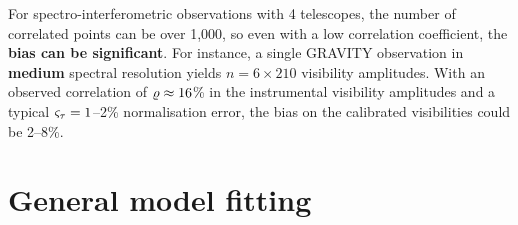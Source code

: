 \documentclass{pasa}
\def\correction#1{{\bfseries #1}}
\begin{document}
For spectro-interferometric observations with 4 telescopes, the number of correlated points can be over 1,000, so even with a low correlation coefficient, the \correction{bias can be significant}. For instance, a single GRAVITY observation in \correction{medium} spectral resolution yields $n = 6 \times 210$ visibility amplitudes. With an observed correlation of $\varrho \approx 16$\% in the instrumental visibility amplitudes \citep{KAM20} and a typical $\varsigma_\tau = 1$--2\% normalisation error, the bias on the calibrated visibilities could be 2--8\%.  

\section{General model fitting}
\label{sec:model}

\begin{figure}
\centering
{}\\

\end{figure}
\end{document}
